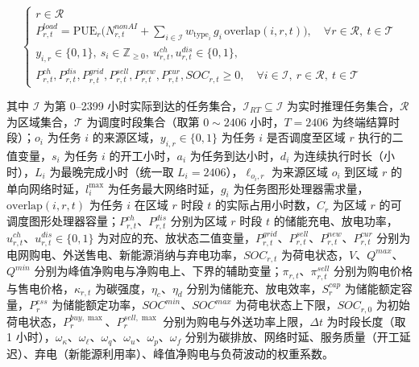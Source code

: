 \documentclass{ctexart}
\begin{document}
\begin{equation}
\begin{cases}
r\in\mathcal{R}\\P^{load}_{r,t}=\mathrm{PUE}_r\Big(N^{nonAI}_{r,t}+\sum_{i\in\mathcal{I}}w_{\mathrm{type}_i}\,g_i\,\mathrm{overlap}(i,r,t)\Big),\quad \forall r\in\mathcal{R},\ t\in\mathcal{T}\\y_{i,r}\in\{0,1\},\ s_i\in\mathbb{Z}_{\ge 0},\ u^{ch}_{r,t},u^{dis}_{r,t}\in\{0,1\},\\P^{ch}_{r,t},P^{dis}_{r,t},P^{grid}_{r,t},P^{sell}_{r,t},P^{new}_{r,t},P^{cur}_{r,t},SOC_{r,t}\ge 0,\quad \forall i\in\mathcal{I},\ r\in\mathcal{R},\ t\in\mathcal{T}
\end{cases}
\end{equation}

其中 $\mathcal{I}$ 为第 0–2399 小时实际到达的任务集合，$\mathcal{I}_{RT}\subseteq\mathcal{I}$ 为实时推理任务集合，$\mathcal{R}$ 为区域集合，$\mathcal{T}$ 为调度时段集合（取第 $0\sim2406$ 小时，$T=2406$ 为终端结算时段）；$o_i$ 为任务 $i$ 的来源区域，$y_{i,r}\in\{0,1\}$ 为任务 $i$ 是否调度至区域 $r$ 执行的二值变量，$s_i$ 为任务 $i$ 的开工小时，$a_i$ 为任务到达小时，$d_i$ 为连续执行时长（小时），$L_i$ 为最晚完成小时（统一取 $L_i=2406$），$\ell_{o_i,r}$ 为来源区域 $o_i$ 到区域 $r$ 的单向网络时延，$l_i^{\max}$ 为任务最大网络时延，$g_i$ 为任务图形处理器需求量，$\mathrm{overlap}(i,r,t)$ 为任务 $i$ 在区域 $r$ 时段 $t$ 的实际占用小时数，$C_r$ 为区域 $r$ 的可调度图形处理器容量；$P^{ch}_{r,t}$、$P^{dis}_{r,t}$ 分别为区域 $r$ 时段 $t$ 的储能充电、放电功率，$u^{ch}_{r,t}$、$u^{dis}_{r,t}\in\{0,1\}$ 为对应的充、放状态二值变量，$P^{grid}_{r,t}$、$P^{sell}_{r,t}$、$P^{new}_{r,t}$、$P^{cur}_{r,t}$ 分别为电网购电、外送售电、新能源消纳与弃电功率，$SOC_{r,t}$ 为荷电状态，$V$、$Q^{max}$、$Q^{min}$ 分别为峰值净购电与净购电上、下界的辅助变量；$\pi_{r,t}$、$\pi^{sell}_{r,t}$ 分别为购电价格与售电价格，$\kappa_{r,t}$ 为碳强度，$\eta_c$、$\eta_d$ 分别为储能充、放电效率，$S^{cap}_r$ 为储能额定容量，$P^{ess}_r$ 为储能额定功率，$SOC^{min}$、$SOC^{max}$ 为荷电状态上下限，$SOC_{r,0}$ 为初始荷电状态，$P^{buy,\max}_r$、$P^{sell,\max}_r$ 分别为购电与外送功率上限，$\Delta t$ 为时段长度（取 1 小时），$\omega_\kappa$、$\omega_\ell$、$\omega_q$、$\omega_u$、$\omega_p$、$\omega_f$ 分别为碳排放、网络时延、服务质量（开工延迟）、弃电（新能源利用率）、峰值净购电与负荷波动的权重系数。
\end{document}

